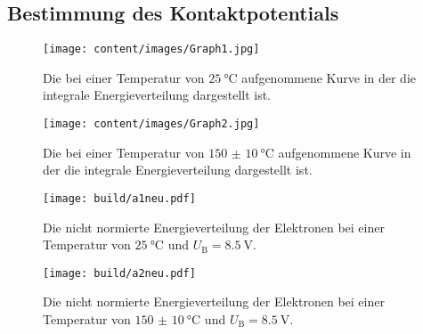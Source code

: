 \subsection{Bestimmung des Kontaktpotentials}
\begin{figure}
	\centering
	\caption{Die bei einer Temperatur von $\SI{25}{\degreeCelsius}$ aufgenommene Kurve in der die integrale Energieverteilung dargestellt ist.}
	\texttt{[image: content/images/Graph1.jpg]}
	\label{fig:a1}
\end{figure}
\begin{figure}
	\centering
	\caption{Die bei einer Temperatur von $\SI{150(10)}{\degreeCelsius}$ aufgenommene Kurve in der die integrale Energieverteilung dargestellt ist.}
	\texttt{[image: content/images/Graph2.jpg]}
	\label{fig:a2}
\end{figure}
\begin{figure}
	\centering
	\caption{Die nicht normierte Energieverteilung der Elektronen bei einer Temperatur von $\SI{25}{\degreeCelsius}$ und $U_\text{B}=\SI{8.5}{\volt}$.}
	\texttt{[image: build/a1neu.pdf]}
	\label{fig:a1A}
\end{figure}
\begin{figure}
	\centering
	\caption{Die nicht normierte Energieverteilung der Elektronen bei einer Temperatur von $\SI{150(10)}{\degreeCelsius}$ und $U_\text{B}=\SI{8.5}{\volt}$.}
	\texttt{[image: build/a2neu.pdf]}
	\label{fig:a2A}
\end{figure}
\begin{center}
	\begin{table}
		\begin{minipage}[t]{0.5\textwidth}
			\setcapwidth[c]{\textwidth}%
			\caption{Das bei den verschieden Gegenspannungen $U_\text{A}$ gemessene Gefälle $\overline{I}$ des Graphen in Abbildung \ref{fig:a1}.}
			\centering
			
		\end{minipage}
		\begin{minipage}[t]{0.5\textwidth}
			\setcapwidth[c]{\textwidth}%
			\caption{Das bei den verschieden Gegenspannungen $U_\text{A}$ gemessene Gefälle $\overline{I}$ des Graphen in Abbildung \ref{fig:a2}.}
			\centering
			
		\end{minipage}
	\end{table}
\end{center}
